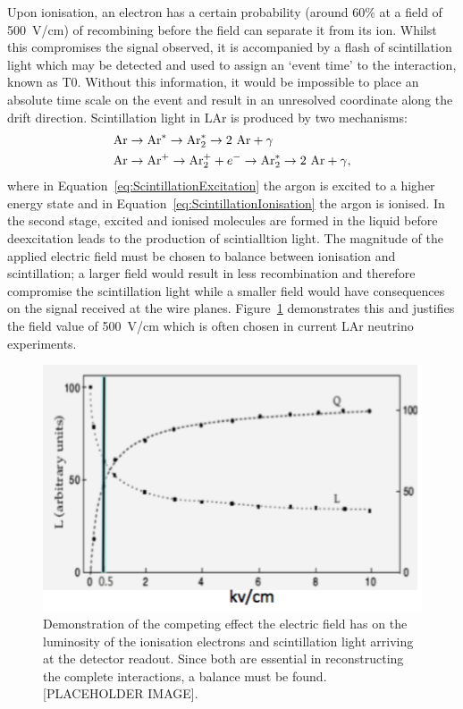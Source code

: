 Upon ionisation, an electron has a certain probability (around 60\% at a field of 500~V/cm) of recombining before the field can separate it from its ion.  Whilst this compromises the signal observed, it is accompanied by a flash of scintillation light which may be detected and used to assign an `event time' to the interaction, known as T0.  Without this information, it would be impossible to place an absolute time scale on the event and result in an unresolved coordinate along the drift direction.  Scintillation light in LAr is produced by two mechanisms:
\begin{align}
  \label{eq:ScintillationExcitation} \textnormal{Ar} &\rightarrow \textnormal{Ar}^* \rightarrow \textnormal{Ar}_2^* \rightarrow 2~\textnormal{Ar} + \gamma \\
  \label{eq:ScintillationIonisation} \textnormal{Ar} &\rightarrow \textnormal{Ar}^+ \rightarrow \textnormal{Ar}_2^+ + e^- \rightarrow \textnormal{Ar}_2^* \rightarrow 2~\textnormal{Ar} + \gamma ,
\end{align}
where in Equation~\ref{eq:ScintillationExcitation} the argon is excited to a higher energy state and in Equation~\ref{eq:ScintillationIonisation} the argon is ionised.  In the second stage, excited and ionised molecules are formed in the liquid before deexcitation leads to the production of scintialltion light.  The magnitude of the applied electric field must be chosen to balance between ionisation and scintillation; a larger field would result in less recombination and therefore compromise the scintillation light while a smaller field would have consequences on the signal received at the wire planes.  Figure~\ref{fig:ElectricFieldScintillationIonisation} demonstrates this and justifies the field value of 500~V/cm which is often chosen in current LAr neutrino experiments.

\begin{figure}
  \centering
  \includegraphics[width=12cm]{ElectricFieldScintillationIonisation.png}
  \caption[Effect of electric field on luminosity of ionisation electrons and scintillation light in a LArTPC.]{Demonstration of the competing effect the electric field has on the luminosity of the ionisation electrons and scintillation light arriving at the detector readout.  Since both are essential in reconstructing the complete interactions, a balance must be found. [PLACEHOLDER IMAGE].}
  \label{fig:ElectricFieldScintillationIonisation}
\end{figure}

